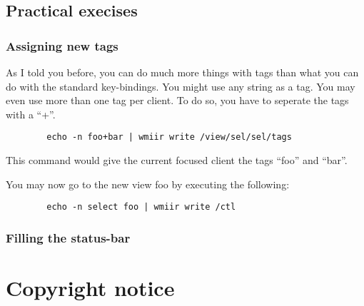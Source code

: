 \documentclass[12pt,a4paper]{article}
\begin{document}
  \subsection{Practical execises}

    \subsubsection{Assigning new tags}

      As I told you before, you can do much more things with tags than
      what you can do with the standard key-bindings. You might use
      any string as a tag. You may even use more than one tag per
      client. To do so, you have to seperate the tags with a ``+''.

      \begin{verbatim}
        echo -n foo+bar | wmiir write /view/sel/sel/tags
      \end{verbatim}

      This command would give the current focused client the tags
      ``foo'' and ``bar''.

      You may now go to the new view foo by executing the following:

      \begin{verbatim}
        echo -n select foo | wmiir write /ctl
      \end{verbatim}

    \subsubsection{Filling the status-bar}

      

\section{Copyright notice}
\end{document}
